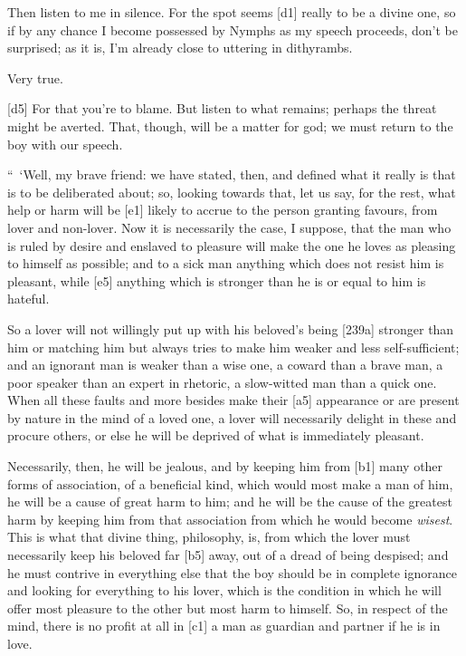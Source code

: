  Then listen to me in silence. For the spot seems {[}d1{]}
really to be a divine one, so if by any chance I become possessed by
Nymphs as my speech proceeds, don't be surprised; as it is, I'm already
close to uttering in
dithyrambs.

 Very true.

{[}d5{]}  For that you're to blame. But listen to what remains;
perhaps the threat might be averted. That, though, will be a matter for
god; we must return to the boy with our speech.

“~‘Well, my brave friend:
we have stated, then, and defined what it really is that is to be
deliberated about; so, looking towards that, let us say, for the rest,
what help or harm will be {[}e1{]} likely to accrue to the person
granting favours, from lover and non-lover. Now it is
necessarily the case, I
suppose, that the man who is ruled by desire and enslaved to pleasure
will make the one he loves as pleasing to himself as possible; and to a
sick man anything which does not resist him is pleasant, while {[}e5{]}
anything which is stronger than he is or equal to him is hateful.

So a lover will not willingly put up with his beloved's being {[}239a{]}
stronger than him or matching him but always tries to make him weaker
and less self-sufficient; and an ignorant man is weaker than a wise one,
a coward than a brave man, a poor speaker than an expert in rhetoric, a
slow-witted man than a quick one. When all these faults and more besides
make their {[}a5{]} appearance or are present by nature in the mind of a
loved one, a lover will necessarily delight in these and procure others,
or else he will be deprived of what is immediately pleasant.

Necessarily, then, he will be jealous, and by keeping him from {[}b1{]}
many other forms of association, of a beneficial kind, which would most
make a man of him, he will be a cause of great harm to him; and he will
be the cause of the greatest harm by keeping him from that association
from which he would become
{\em wisest}. This is
what that divine thing, philosophy, is, from which the lover must
necessarily keep his beloved far {[}b5{]} away, out of a dread of being
despised; and he must contrive in everything else that the boy should be
in complete ignorance and looking for everything to his lover, which is
the condition in which he will offer most pleasure to the other but most
harm to himself. So, in respect of the mind, there is no profit at all
in {[}c1{]} a man as guardian and partner if he is in love.


